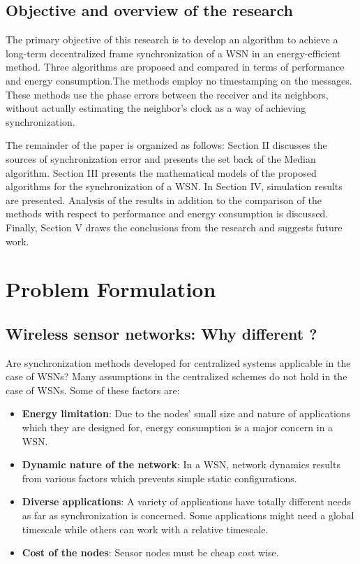 \documentclass[journal]{IEEEtran}
\begin{document}
\subsection{\textbf{Objective and overview of the research}}
The primary objective of this research is to develop an algorithm to
achieve a long-term decentralized frame synchronization of a WSN in
an energy-efficient method. Three algorithms are proposed and compared in terms of performance and
energy consumption.The methods employ no timestamping on the
messages. These methods use the phase errors between the receiver and
its neighbors, without actually estimating the neighbor's clock as a
way of achieving synchronization.
\par The remainder of the paper is organized as follows:
Section II discusses the sources of synchronization error and presents the set back of the Median algorithm.
Section III presents the mathematical models of the proposed algorithms for the synchronization of a WSN.
In Section IV, simulation results are presented. Analysis of the results in addition to the comparison of the methods with respect to performance and energy consumption is discussed. Finally, Section V draws the conclusions from the research and suggests future work.
\section{\textbf{Problem Formulation}}
\subsection{\textbf{Wireless sensor networks: Why different ?}}
Are synchronization methods developed for centralized systems applicable in the case of WSNs? Many
assumptions in the centralized schemes do not hold in the case
of WSNs. Some of these factors are:
\begin{itemize}
\item \textbf{Energy limitation}: Due to the nodes' small size and nature of applications which they
are designed for, energy consumption is a major concern in a WSN.
\item \textbf{Dynamic nature of the network}: In a WSN, network
dynamics results from various factors which prevents simple
static configurations.
\item \textbf{Diverse applications}: A variety of applications
have totally different needs as far as synchronization is concerned.
Some applications might need a global timescale while
others can work with a relative timescale.
\item \textbf{Cost of the nodes}: Sensor nodes must be cheap cost wise.
\end{itemize}
\end{document}
